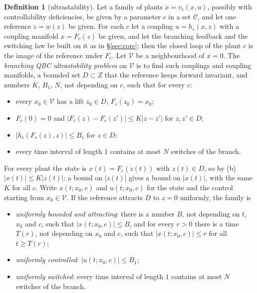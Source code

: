 \documentclass[11pt,reqno]{amsart}
\theoremstyle{plain}
\theoremstyle{definition}
\newtheorem*{definition}{Definition}
\theoremstyle{remark}
\begin{document}
\begin{definition}[ultrastability]\label{def:ultra}
Let a family of plants $\dot x=v_c(x,u)$, possibly with controllability deficiencies, be given by a parameter $c$ in a set $\mathcal C$, and let one reference $\dot z=w(z)$ be given. For each $c$ let a coupling $u=h_c(x,z)$ with a coupling manifold $x=F_c(z)$ be given, and let the branching feedback and the switching law be built on it as in \S\ref{sec:core}; then the closed loop of the plant $c$ is the image of the reference under $F_c$. Let $\mathcal V$ be a neighbourhood of $x=0$. The \emph{branching QBC ultrastability problem} on $\mathcal V$ is to find such couplings and coupling manifolds, a bounded set $D\subset Z$ that the reference keeps forward invariant, and numbers $K$, $B_1$, $N$, not depending on $c$, such that for every $c$:
\begin{itemize}
\item[(a)] every $x_0\in\mathcal V$ has a lift $z_0\in D$, $F_c(z_0)=x_0$;
\item[(b)] $F_c(0)=0$ and $|F_c(z)-F_c(z')|\le K|z-z'|$ for $z,z'\in D$;
\item[(c)] $|h_c(F_c(z),z)|\le B_1$ for $z\in D$;
\item[(d)] every time interval of length $1$ contains at most $N$ switches of the branch.
\end{itemize}
\end{definition}

For every plant the state is $x(t)=F_c(z(t))$ with $z(t)\in D$, so by (b) $|x(t)|\le K|z(t)|$: a bound on $|z(t)|$ gives a bound on $|x(t)|$, with the same $K$ for all $c$. Write $x(t;x_0,c)$ and $u(t;x_0,c)$ for the state and the control starting from $x_0\in\mathcal V$. If the reference attracts $D$ to $z=0$ uniformly, the family is
\begin{itemize}
\item \emph{uniformly bounded and attracting}: there is a number $B$, not depending on $t$, $x_0$ and $c$, such that $|x(t;x_0,c)|\le B$, and for every $r>0$ there is a time $T(r)$, not depending on $x_0$ and $c$, such that $|x(t;x_0,c)|\le r$ for all $t\ge T(r)$;
\item \emph{uniformly controlled}: $|u(t;x_0,c)|\le B_1$;
\item \emph{uniformly switched}: every time interval of length $1$ contains at most $N$ switches of the branch.
\end{itemize}
\end{document}
